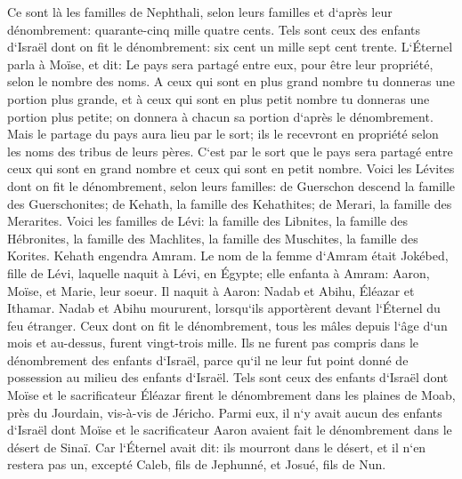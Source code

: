 \verse Ce sont là les familles de Nephthali, selon leurs familles et d`après leur dénombrement: quarante-cinq mille quatre cents. 
\verse Tels sont ceux des enfants d`Israël dont on fit le dénombrement: six cent un mille sept cent trente. 
\verse L`Éternel parla à Moïse, et dit: 
\verse Le pays sera partagé entre eux, pour être leur propriété, selon le nombre des noms. 
\verse A ceux qui sont en plus grand nombre tu donneras une portion plus grande, et à ceux qui sont en plus petit nombre tu donneras une portion plus petite; on donnera à chacun sa portion d`après le dénombrement. 
\verse Mais le partage du pays aura lieu par le sort; ils le recevront en propriété selon les noms des tribus de leurs pères. 
\verse C`est par le sort que le pays sera partagé entre ceux qui sont en grand nombre et ceux qui sont en petit nombre. 
\verse Voici les Lévites dont on fit le dénombrement, selon leurs familles: de Guerschon descend la famille des Guerschonites; de Kehath, la famille des Kehathites; de Merari, la famille des Merarites. 
\verse Voici les familles de Lévi: la famille des Libnites, la famille des Hébronites, la famille des Machlites, la famille des Muschites, la famille des Korites. Kehath engendra Amram. 
\verse Le nom de la femme d`Amram était Jokébed, fille de Lévi, laquelle naquit à Lévi, en Égypte; elle enfanta à Amram: Aaron, Moïse, et Marie, leur soeur. 
\verse Il naquit à Aaron: Nadab et Abihu, Éléazar et Ithamar. 
\verse Nadab et Abihu moururent, lorsqu`ils apportèrent devant l`Éternel du feu étranger. 
\verse Ceux dont on fit le dénombrement, tous les mâles depuis l`âge d`un mois et au-dessus, furent vingt-trois mille. Ils ne furent pas compris dans le dénombrement des enfants d`Israël, parce qu`il ne leur fut point donné de possession au milieu des enfants d`Israël. 
\verse Tels sont ceux des enfants d`Israël dont Moïse et le sacrificateur Éléazar firent le dénombrement dans les plaines de Moab, près du Jourdain, vis-à-vis de Jéricho. 
\verse Parmi eux, il n`y avait aucun des enfants d`Israël dont Moïse et le sacrificateur Aaron avaient fait le dénombrement dans le désert de Sinaï. 
\verse Car l`Éternel avait dit: ils mourront dans le désert, et il n`en restera pas un, excepté Caleb, fils de Jephunné, et Josué, fils de Nun. 

